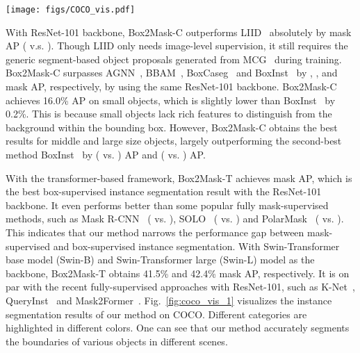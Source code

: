 \documentclass[12pt,onecolumn,letterpaper]{article}
\begin{document}
\begin{figure*}[t]
	\centering
	\texttt{[image: figs/COCO\_vis.pdf]}
	\caption{\textbf{Visualization of instance segmentation results} on COCO. The model is trained with only box annotations. Different colors encode different categories and instances. Best viewed on screen.}
	\label{fig:coco_vis_1}
\end{figure*}

With ResNet-101 backbone, Box2Mask-C outperforms  LIID~\cite{tpami2020leveraging} absolutely by  mask AP ( v.s. ). Though LIID only needs image-level supervision, it still requires the generic segment-based object proposals generated from MCG~\cite{tpmai2017mcg} during training. Box2Mask-C surpasses  AGNN~\cite{TPAMI2021affinity}, BBAM~\cite{cvpr2021bbam},  BoxCaseg~\cite{cvpr2021boxcaseg} and BoxInst~\cite{cvpr2021_boxinst} by , ,  and  mask AP, respectively, by using the same ResNet-101 backbone. Box2Mask-C achieves 16.0\% AP on small objects, which is slightly lower than BoxInst~\cite{cvpr2021_boxinst} by 0.2\%. This is because small objects lack rich features to distinguish from the background within the bounding box. However, Box2Mask-C obtains the best results for middle and large size objects, largely outperforming the second-best method BoxInst~\cite{cvpr2021_boxinst} by  ( vs. ) AP and  ( vs. ) AP.

With the transformer-based framework, Box2Mask-T achieves  mask AP, which is the best box-supervised instance segmentation result with the ResNet-101 backbone. It even performs better than some popular fully mask-supervised methods, such as Mask R-CNN~\cite{iccv2017maskrcnn} ( vs. ),  SOLO~\cite{PMAI2021solo} ( vs. ) and PolarMask~\cite{cvpr_2020polarmask} ( vs. ). This indicates that our method narrows the performance gap between mask-supervised and box-supervised instance segmentation.
With Swin-Transformer base model (Swin-B) and Swin-Transformer large (Swin-L) model as the backbone, Box2Mask-T obtains 41.5\% and 42.4\% mask AP, respectively. It is on par with the recent fully-supervised approaches with ResNet-101, such as K-Net~\cite{nips2021knet},  QueryInst~\cite{ICCV2021_queryinst} and Mask2Former~\cite{cvpr2022mask2former}. 
Fig.~\ref{fig:coco_vis_1} visualizes the instance segmentation results of our method on COCO. 
Different categories are highlighted in different colors. One can see that our method accurately segments the boundaries of various objects in different scenes.
\end{document}
